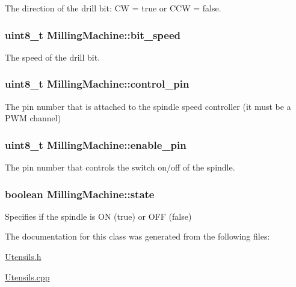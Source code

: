The direction of the drill bit\+: C\+W = true or C\+C\+W = false. 

\hypertarget{class_milling_machine_a1980b7b766917656ce78d25c11b3b5c3}{
\subsubsection[{bit\+\_\+speed}]{\setlength{\rightskip}{0pt plus 5cm}uint8\+\_\+t Milling\+Machine\+::bit\+\_\+speed\hspace{0.3cm}{\ttfamily [private]}}}\label{class_milling_machine_a1980b7b766917656ce78d25c11b3b5c3}


The speed of the drill bit. 

\hypertarget{class_milling_machine_a6e0a4a728c4063b82d0f726123817d69}{
\subsubsection[{control\+\_\+pin}]{\setlength{\rightskip}{0pt plus 5cm}uint8\+\_\+t Milling\+Machine\+::control\+\_\+pin\hspace{0.3cm}{\ttfamily [private]}}}\label{class_milling_machine_a6e0a4a728c4063b82d0f726123817d69}


The pin number that is attached to the spindle speed controller (it must be a P\+W\+M channel) 

\hypertarget{class_milling_machine_a129e02eb0a1b612587fd0175a413cfdd}{
\subsubsection[{enable\+\_\+pin}]{\setlength{\rightskip}{0pt plus 5cm}uint8\+\_\+t Milling\+Machine\+::enable\+\_\+pin\hspace{0.3cm}{\ttfamily [private]}}}\label{class_milling_machine_a129e02eb0a1b612587fd0175a413cfdd}


The pin number that controls the switch on/off of the spindle. 

\hypertarget{class_milling_machine_a8d46b3e3c141e9402a2729b61550babb}{
\subsubsection[{state}]{\setlength{\rightskip}{0pt plus 5cm}boolean Milling\+Machine\+::state\hspace{0.3cm}{\ttfamily [private]}}}\label{class_milling_machine_a8d46b3e3c141e9402a2729b61550babb}


Specifies if the spindle is O\+N (true) or O\+F\+F (false) 



The documentation for this class was generated from the following files\+:\begin{DoxyCompactItemize}
\item 
\hyperlink{_utensils_8h}{Utensils.\+h}\item 
\hyperlink{_utensils_8cpp}{Utensils.\+cpp}\end{DoxyCompactItemize}
